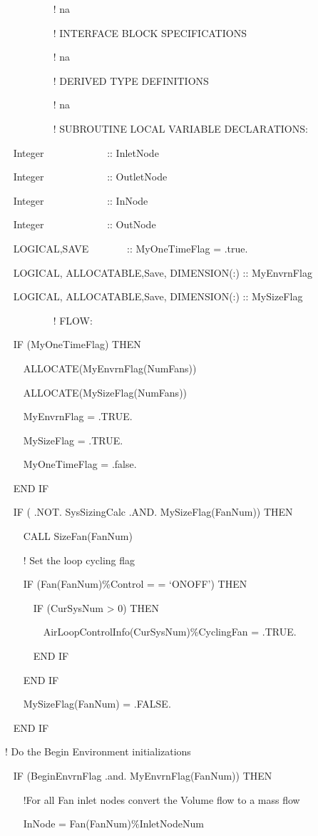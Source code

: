 ~~~~~~~~~ ! na

~~~~~~~~~ ! INTERFACE BLOCK SPECIFICATIONS

~~~~~~~~~ ! na

~~~~~~~~~ ! DERIVED TYPE DEFINITIONS

~~~~~~~~~ ! na

~~~~~~~~~ ! SUBROUTINE LOCAL VARIABLE DECLARATIONS:

~ Integer~~~~~~~~~~~~ :: InletNode

~ Integer~~~~~~~~~~~~ :: OutletNode

~ Integer~~~~~~~~~~~~ :: InNode

~ Integer~~~~~~~~~~~~ :: OutNode

~ LOGICAL,SAVE~~~~~~~ :: MyOneTimeFlag = .true.

~ LOGICAL, ALLOCATABLE,Save, DIMENSION(:) :: MyEnvrnFlag

~ LOGICAL, ALLOCATABLE,Save, DIMENSION(:) :: MySizeFlag

~~~~~~~~~ ! FLOW:

~ IF (MyOneTimeFlag) THEN

~~~ ALLOCATE(MyEnvrnFlag(NumFans))

~~~ ALLOCATE(MySizeFlag(NumFans))

~~~ MyEnvrnFlag = .TRUE.

~~~ MySizeFlag = .TRUE.

~~~ MyOneTimeFlag = .false.

~ END IF

~ IF ( .NOT. SysSizingCalc .AND. MySizeFlag(FanNum)) THEN

~~~ CALL SizeFan(FanNum)

~~~ ! Set the loop cycling flag

~~~ IF (Fan(FanNum)\%Control = = `ONOFF') THEN

~~~~~ IF (CurSysNum \textgreater{} 0) THEN

~~~~~~~ AirLoopControlInfo(CurSysNum)\%CyclingFan = .TRUE.

~ ~~~~END IF

~~~ END IF

~~~ MySizeFlag(FanNum) = .FALSE.

~ END IF

! Do the Begin Environment initializations

~ IF (BeginEnvrnFlag .and. MyEnvrnFlag(FanNum)) THEN

~~~ !For all Fan inlet nodes convert the Volume flow to a mass flow

~~~ InNode = Fan(FanNum)\%InletNodeNum


